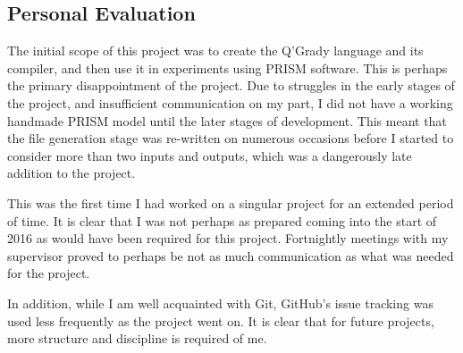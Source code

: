 \documentclass[report.tex]{subfiles}
\begin{document}
\subsection{Personal Evaluation} %
\label{sub:personal_evaluation}
The initial scope of this project was to create the Q'Grady language and its
compiler, and then use it in experiments using PRISM software. This is perhaps
the primary disappointment of the project. Due to struggles in the early stages
of the project, and insufficient communication on my part, I did not have a
working handmade PRISM model until the later stages of development. This meant
that the file generation stage was re-written on numerous occasions before I
started to consider more than two inputs and outputs, which was a dangerously
late addition to the project.

This was the first time I had worked on a singular project for an extended
period of time. It is clear that I was not perhaps as prepared coming into the
start of 2016 as would have been required for this project. Fortnightly meetings
with my supervisor proved to perhaps be not as much communication as what was
needed for the project.

In addition, while I am well acquainted with Git, GitHub's issue tracking was
used less frequently as the project went on. It is clear that for future
projects, more structure and discipline is required of me.

\newpage
\end{document}
